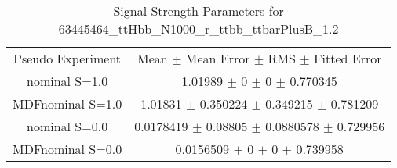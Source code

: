 \begin{table}
\centering
\caption{Signal Strength Parameters for 63445464\_ttHbb\_N1000\_r\_ttbb\_ttbarPlusB\_1.2}
\begin{tabular}{cc}
\toprule
Pseudo Experiment & Mean $\pm$ Mean Error $\pm$ RMS $\pm$ Fitted Error\\
nominal S=1.0 & \num{1.01989} $\pm$ \num{0} $\pm$ \num{0} $\pm$ \num{0.770345}\\
MDFnominal S=1.0 & \num{1.01831} $\pm$ \num{0.350224} $\pm$ \num{0.349215} $\pm$ \num{0.781209}\\
nominal S=0.0 & \num{0.0178419} $\pm$ \num{0.08805} $\pm$ \num{0.0880578} $\pm$ \num{0.729956}\\
MDFnominal S=0.0 & \num{0.0156509} $\pm$ \num{0} $\pm$ \num{0} $\pm$ \num{0.739958}\\
\bottomrule
\end{tabular}
\end{table}